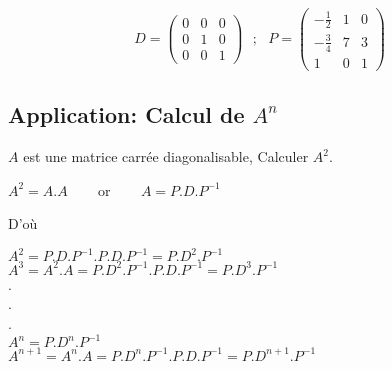 \documentclass[a4paper,12pt,french]{article}
\begin{document}
	\[ D=\begin{pmatrix}
		0 & 0 & 0  \\
		0 & 1 & 0\\
		0 & 0 & 1
		
	\end{pmatrix} ~~~;~~~P=\begin{pmatrix}
		-\frac{1}{2} & 1 & 0  \\
		-\frac{3}{4} & 7 & 3\\
		1& 0 & 1
		
	\end{pmatrix}
	\]
	\subsection{Application: Calcul de $A^n$}
	$A$ est une matrice carrée diagonalisable, Calculer $A^2$.
	\begin{center}
		$A^2=A.A$ ~~~ or ~~~ $A=P.D.P^{-1}$\\
	\end{center}
	D'où 
	\begin{center}
		$A^{2}=P.D.P^{-1}.P.D.P^{-1}=P.D^2.P^{-1}$\\
		$A^{3}=A^{2}.A=P.D^{2}.P^{-1}.P.D.P^{-1}=P.D^3.P^{-1}$\\
		.\\
		.\\
		.\\
		$A^n=P.D^n.P^{-1}$\\
		$A^{n+1}=A^n.A=P.D^n.P^{-1}.P.D.P^{-1}=P.D^{n+1}.P^{-1}$ 
		
	\end{center}
	
	
	
	
	
\end{document}
